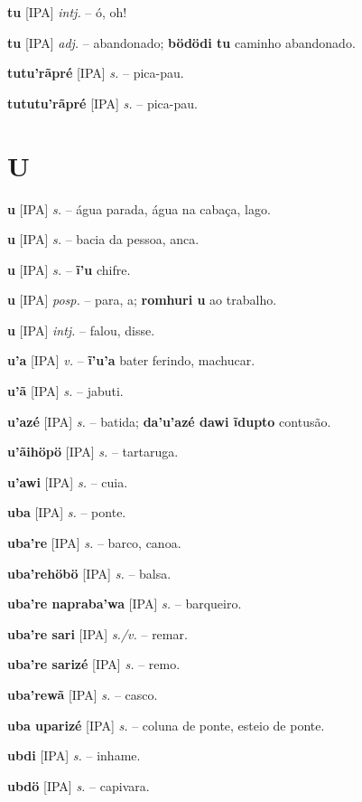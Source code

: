 \textbf{tu} [IPA] \textit{intj.} -- ó, oh!

\textbf{tu} [IPA] \textit{adj.} -- abandonado; \textbf{bödödi tu} caminho abandonado.

\textbf{tutu'rãpré} [IPA] \textit{s.} -- pica-pau.

\textbf{tututu'rãpré} [IPA] \textit{s.} -- pica-pau.


\section*{U}



\textbf{u} [IPA] \textit{s.} -- água parada, água na cabaça, lago.

\textbf{u} [IPA] \textit{s.} -- bacia da pessoa, anca.

\textbf{u} [IPA] \textit{s.} -- \textbf{ĩ'u} chifre.

\textbf{u} [IPA] \textit{posp.} -- para, a; \textbf{romhuri u} ao trabalho.

\textbf{u} [IPA] \textit{intj.} -- falou, disse.

\textbf{u'a} [IPA] \textit{v.} -- \textbf{ĩ'u'a} bater ferindo, machucar.

\textbf{u'ã} [IPA] \textit{s.} -- jabuti.

\textbf{u'azé} [IPA] \textit{s.} -- batida; \textbf{da'u'azé dawi ĩdupto} contusão.

\textbf{u'ãihöpö} [IPA] \textit{s.} -- tartaruga.

\textbf{u'awi} [IPA] \textit{s.} -- cuia.

\textbf{uba} [IPA] \textit{s.} -- ponte.

\textbf{uba're} [IPA] \textit{s.} -- barco, canoa.

\textbf{uba'rehöbö} [IPA] \textit{s.} -- balsa.

\textbf{uba're napraba'wa} [IPA] \textit{s.} -- barqueiro.

\textbf{uba're sari} [IPA] \textit{s./v.} -- remar.

\textbf{uba're sarizé} [IPA] \textit{s.} -- remo.

\textbf{uba'rewã} [IPA] \textit{s.} -- casco.

\textbf{uba uparizé} [IPA] \textit{s.} -- coluna de ponte, esteio de ponte.

\textbf{ubdi} [IPA] \textit{s.} -- inhame.

\textbf{ubdö} [IPA] \textit{s.} -- capivara.

